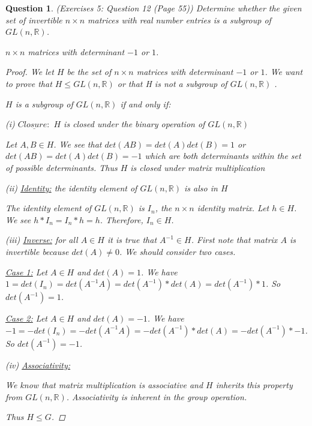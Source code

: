 \documentclass{article}
\newcommand*{\field}[1]{\mathbb{#1}}%
\newtheorem{ques}{Question}
\begin{document}
\begin{ques} (Exercises 5: Question 12 (Page 55))
	Determine whether the given set of invertible $n \times n$ matrices with real number entries is a subgroup of $GL(n, \field{R})$.

	$n \times n $ matrices with determinant $-1$ or $1$.
	\begin{proof}
		
		We let $H$ be the set of $n \times n$ matrices with determinant $-1$ or $1$. We want to prove that $H \leq GL(n, \field{R})$ or that H is not a subgroup of $GL(n, \field{R})$ . 
		
		$H$ is a subgroup of $GL(n, \field{R})$ if and only if:
		
		(i) $\underline{Closure:}$ $H$ is closed under the binary operation of $GL(n, \field{R})$
		
			Let $A, B \in H$. We see that $det(AB) = det(A)det(B) = 1$ or $det(AB) = det(A)det(B) = -1$ which are both determinants within the set of possible determinants. Thus $H$ is closed under matrix multiplication
		
		(ii) \underline{Identity:} the identity element of $GL(n, \field{R})$ is also in $H$
			
			The identity element of $GL(n, \field{R})$ is $I_n$, the $n \times n$ identity matrix.  Let $h  \in H$. We see $h * I_n = I_n * h = h$. Therefore, $I_n \in H$. 
		
		(iii) \underline{Inverse:} for all $A \in H$ it is true that $A^{-1} \in H$.  First note that matrix $A$ is invertible because $det(A) \ne 0$. We should consider two cases.
		
			\underline{Case 1:} Let $A \in H$ and $det(A) = 1$. We have $1 = det(I_n) = det(A^{-1}A) = det(A^{-1}) * det(A) = det(A^{-1}) * 1$. So $det(A^{-1}) = 1$.
			
			\underline{Case 2:} Let $A \in H$ and $det(A) = -1$. We have $-1 = -det(I_n) = -det(A^{-1}A) = -det(A^{-1}) * det(A) = -det(A^{-1}) * -1$. So $det(A^{-1}) = -1$.
			
		
		(iv) \underline{Associativity:}
		
		We know that matrix multiplication is associative and $H$ inherits this property from $GL(n,\field{R})$.  Associativity is inherent in the group operation.
		
		Thus $H \leq G$.
	\end{proof}
\end{ques}
\end{document}
